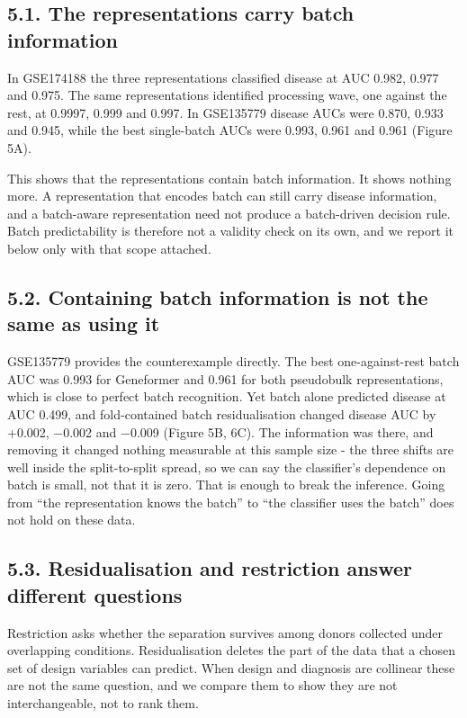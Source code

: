 
\subsection{5.1. The representations carry batch information}\label{the-representations-carry-batch-information}

In GSE174188 the three representations classified disease at AUC 0.982, 0.977 and 0.975. The same representations identified processing wave, one against the rest, at 0.9997, 0.999 and 0.997. In GSE135779 disease AUCs were 0.870, 0.933 and 0.945, while the best single-batch AUCs were 0.993, 0.961 and 0.961 (Figure 5A).

This shows that the representations contain batch information. It shows nothing more. A representation that encodes batch can still carry disease information, and a batch-aware representation need not produce a batch-driven decision rule. Batch predictability is therefore not a validity check on its own, and we report it below only with that scope attached.

\subsection{5.2. Containing batch information is not the same as using it}\label{containing-batch-information-is-not-the-same-as-using-it}

GSE135779 provides the counterexample directly. The best one-against-rest batch AUC was 0.993 for Geneformer and 0.961 for both pseudobulk representations, which is close to perfect batch recognition. Yet batch alone predicted disease at AUC 0.499, and fold-contained batch residualisation changed disease AUC by +0.002, −0.002 and −0.009 (Figure 5B, 6C). The information was there, and removing it changed nothing measurable at this sample size - the three shifts are well inside the split-to-split spread, so we can say the classifier's dependence on batch is small, not that it is zero. That is enough to break the inference. Going from ``the representation knows the batch'' to ``the classifier uses the batch'' does not hold on these data.

\subsection{5.3. Residualisation and restriction answer different questions}\label{residualisation-and-restriction-answer-different-questions}

Restriction asks whether the separation survives among donors collected under overlapping conditions. Residualisation deletes the part of the data that a chosen set of design variables can predict. When design and diagnosis are collinear these are not the same question, and we compare them to show they are not interchangeable, not to rank them.

